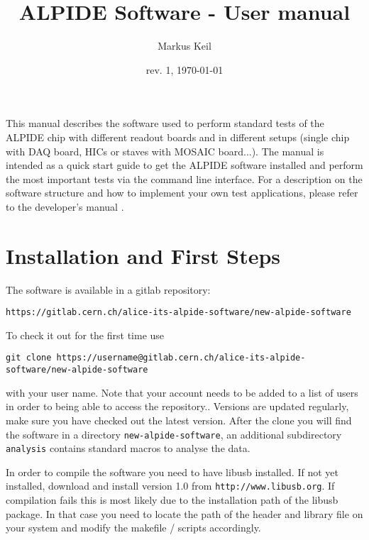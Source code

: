 \documentclass{article}
\begin{document}
\title{ALPIDE Software - User manual}
\date{rev. 1, \today}
\author{Markus Keil}
\maketitle

This manual describes the software used to perform standard tests of the ALPIDE chip with different readout boards and in different setups (single chip with DAQ board, HICs or staves with MOSAIC board...). 
The manual is intended as a quick start guide to get the ALPIDE
software installed and perform the most important tests via the
command line interface. For a description on the software structure and how to implement your own test applications, please refer to the developer's manual . 


\section {Installation and First Steps}

The software is available in a gitlab repository: 

\begin{lstlisting}
https://gitlab.cern.ch/alice-its-alpide-software/new-alpide-software
\end{lstlisting}

To check it out for the first time use

\begin{lstlisting}
git clone https://username@gitlab.cern.ch/alice-its-alpide-software/new-alpide-software
\end{lstlisting}

with your user name. Note that your account needs to be added to a
list of users in order to being able to access the repository..
Versions are updated regularly, make sure you have checked out the
latest version. After the clone you will find the software in a directory \texttt{new-alpide-software}, an additional subdirectory \texttt{analysis} contains standard macros to analyse the data. 




In order to compile the software you need to have libusb installed. If
not yet installed, download and install version 1.0
from \texttt{http://www.libusb.org}.
If compilation fails this is most likely due to the installation path
of the libusb package. In that case you need to locate the path of the
header and library file on your system and modify the makefile / scripts
accordingly. 
\end{document}
